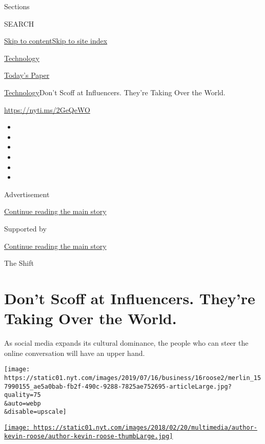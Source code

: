 Sections

SEARCH

\protect\hyperlink{site-content}{Skip to
content}\protect\hyperlink{site-index}{Skip to site index}

\href{https://www.nytimes.com/section/technology}{Technology}

\href{https://myaccount.nytimes.com/auth/login?response_type=cookie\&client_id=vi}{}

\href{https://www.nytimes.com/section/todayspaper}{Today's Paper}

\href{/section/technology}{Technology}\textbar{}Don't Scoff at
Influencers. They're Taking Over the World.

\href{https://nyti.ms/2GeQeWO}{https://nyti.ms/2GeQeWO}

\begin{itemize}
\item
\item
\item
\item
\item
\item
\end{itemize}

Advertisement

\protect\hyperlink{after-top}{Continue reading the main story}

Supported by

\protect\hyperlink{after-sponsor}{Continue reading the main story}

The Shift

\hypertarget{dont-scoff-at-influencers-theyre-taking-over-the-world}{%
\section{Don't Scoff at Influencers. They're Taking Over the
World.}\label{dont-scoff-at-influencers-theyre-taking-over-the-world}}

As social media expands its cultural dominance, the people who can steer
the online conversation will have an upper hand.

\texttt{[image: https://static01.nyt.com/images/2019/07/16/business/16roose2/merlin\_157990155\_ae5a0bab-fb2f-490c-9288-7825ae752695-articleLarge.jpg?quality=75\\\&auto=webp\\\&disable=upscale]}

\href{https://www.nytimes.com/by/kevin-roose}{\texttt{[image: https://static01.nyt.com/images/2018/02/20/multimedia/author-kevin-roose/author-kevin-roose-thumbLarge.jpg]}}

